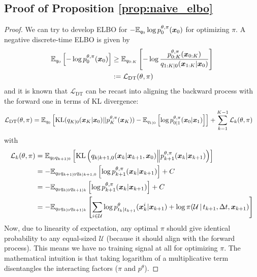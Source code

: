 \subsection{Proof of Proposition \ref{prop:naive_elbo}}
\begin{proof}
    We can try to develop ELBO for $-\mathbb{E}_{q_0}\log p_0^{\theta,\pi}(\bm x_0)$ for optimizing $\pi$. A negative discrete-time ELBO is given by 
\begin{align*}
    \mathbb{E}_{q_0}\left[-\log p^{\theta, \pi}_{0}(\bm x_0)\right]&\geq \mathbb{E}_{q_{0:K}}\left[-\log\frac{p_{0:K}^{\theta,\pi}(\bm x_{0:K})}{q_{1:K|0}(\bm x_{1:K}|\bm x_0)}\right]\\
    &:=\mathcal L_\text{DT}(\theta,\pi)
\end{align*}
and it is known that $\mathcal L_\text{DT}$ can be recast into aligning the backward process with the forward one in terms of KL divergence:
\begin{align*}
    \mathcal L_\text{DT}(\theta,\pi)&=\mathbb{E}_{q_0}\left[\mathrm{KL}(q_{K|0}(\bm x_K|\bm x_0)||p_K^{\theta,\pi}(\bm x_K))-\mathbb{E}_{q_{1|0}}\left[\log p_{0|1}^{\theta,\pi}(\bm x_0|\bm x_1)\right]\right]+\sum_{k=1}^{K-1}\mathcal L_k(\theta,\pi)
\end{align*}
with
\begin{align*}
    \mathcal L_k(\theta,\pi)
    &=\mathbb{E}_{q_0q_{k+1|0}}\left[\mathrm{KL}\left(q_{k|k+1,0}(\bm x_k|\bm x_{k+1},\bm x_0)\middle\|p^{\theta, \pi}_{k+1}(\bm x_k|\bm x_{k+1})\right)\right]\\
    &=-\mathbb{E}_{q_0q_{k+1|0}q_{k|k+1,0}}\left[\log p_{k+1}^{\theta,\pi}(\bm x_k|\bm x_{k+1})\right]+C\\
    &=-\mathbb{E}_{q_0q_{k|0}q_{k+1|k}}\left[\log p_{k+1}^{\theta,\pi}(\bm x_k|\bm x_{k+1})\right]+C\\
    &=-\mathbb{E}_{q_0q_{k|0}q_{k+1|k}}\left[\sum_{i\in\mathcal U}\log p^\theta_{t_k|t_{k+1}}(\bm x^i_k|\bm x_{k+1})+\log\pi(\mathcal U\,|\,t_{k+1},\Delta t,\bm x_{k+1})\right]
\end{align*}
Now, due to linearity of expectation, any optimal $\pi$ should give identical probability to any equal-sized $\mathcal U$ (because it should align with the forward process). This means we have no training signal at all for optimizing $\pi$. The mathematical intuition is that taking logarithm of a multiplicative term disentangles the interacting factors ($\pi$ and $p^\theta$).
\end{proof}
\fi


